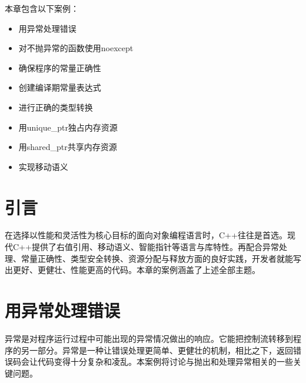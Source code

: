 
本章包含以下案例：



\begin{itemize}
\item 用异常处理错误



\item 对不抛异常的函数使用noexcept



\item 确保程序的常量正确性



\item 创建编译期常量表达式



\item 进行正确的类型转换



\item 用unique\_ptr独占内存资源



\item 用shared\_ptr共享内存资源



\item 实现移动语义

\end{itemize}



\section{引言}



在选择以性能和灵活性为核心目标的面向对象编程语言时，C++往往是首选。现代C++提供了右值引用、移动语义、智能指针等语言与库特性。再配合异常处理、常量正确性、类型安全转换、资源分配与释放方面的良好实践，开发者就能写出更好、更健壮、性能更高的代码。本章的案例涵盖了上述全部主题。



\section{用异常处理错误}



异常是对程序运行过程中可能出现的异常情况做出的响应。它能把控制流转移到程序的另一部分。异常是一种让错误处理更简单、更健壮的机制，相比之下，返回错误码会让代码变得十分复杂和凌乱。本案例将讨论与抛出和处理异常相关的一些关键问题。



